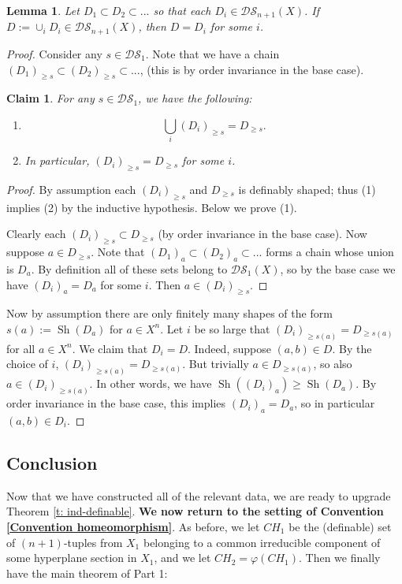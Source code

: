 \documentclass{amsart}
\newtheorem{lemma}[theorem]{Lemma}
\newtheorem{claim}[theorem]{Claim}
\theoremstyle{definition}
\begin{document}
\begin{lemma}
    Let $D_1\subset D_2\subset...$ so that each $D_i\in\mathcal{DS}_{n+1}(X)$. If $D:=\cup_iD_i\in\mathcal{DS}_{n+1}(X)$, then $D=D_i$ for some $i$.
\end{lemma}
\begin{proof}
    Consider any $s\in\mathcal{DS}_1$. Note that we have a chain $(D_1)_{\geq s}\subset(D_2)_{\geq s}\subset...$, (this is by order invariance in the base case).
    \begin{claim}
        For any $s\in\mathcal{DS}_1$, we have the following:
        \begin{enumerate}
            \item $$\bigcup_i(D_i)_{\geq s}=D_{\geq s}.$$
            \item In particular, $(D_i)_{\geq s}=D_{\geq s}$ for some $i$.
        \end{enumerate}
    \end{claim}
    \begin{proof}
        By assumption each $(D_i)_{\geq s}$ and $D_{\geq s}$ is definably shaped; thus (1) implies (2) by the inductive hypothesis. Below we prove (1).
        
        Clearly each $(D_i)_{\geq s}\subset D_{\geq s}$ (by order invariance in the base case). Now suppose $a\in D_{\geq s}$. Note that $(D_1)_a\subset(D_2)_a\subset...$ forms a chain whose union is $D_a$. By definition all of these sets belong to $\mathcal{DS}_1(X)$, so by the base case we have $(D_i)_a=D_a$ for some $i$. Then $a\in(D_i)_{\geq s}$.
\end{proof} 
Now by assumption there are only finitely many shapes of the form $s(a):=\operatorname{Sh}(D_a)$ for $a\in X^n$. Let $i$ be so large that $(D_i)_{\geq s(a)}=D_{\geq s(a)}$ for all $a\in X^n$. We claim that $D_i=D$. Indeed, suppose $(a,b)\in D$. By the choice of $i$, $(D_i)_{\geq s(a)}=D_{\geq s(a)}$. But trivially $a\in D_{\geq s(a)}$, so also $a\in(D_i)_{\geq s(a)}$. In other words, we have $\operatorname{Sh}((D_i)_a)\geq\operatorname{Sh}(D_a)$. By order invariance in the base case, this implies $(D_i)_a=D_a$, so in particular $(a,b)\in D_i$. 
\end{proof}

\subsection{Conclusion}

Now that we have constructed all of the relevant data, we are ready to upgrade Theorem \ref{t: ind-definable}. \textbf{We now return to the setting of Convention \ref{Convention homeomorphism}}. As before, we let $CH_1$ be the (definable) set of $(n+1)$-tuples from $X_1$ belonging to a common irreducible component of some hyperplane section in $X_1$, and we let $CH_2=\varphi(CH_1)$. Then we finally have the main theorem of Part 1:
\end{document}
